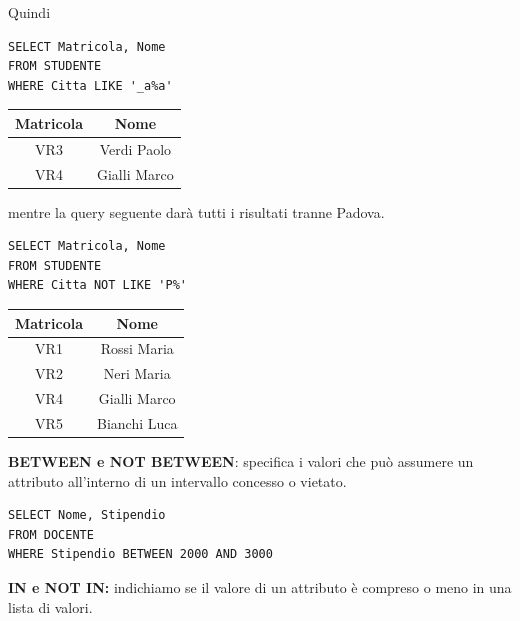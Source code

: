 \documentclass{article}
\begin{document}
Quindi 

\begin{minipage}{0.45\textwidth}
\begin{lstlisting}[style=sqlstyle]
SELECT Matricola, Nome
FROM STUDENTE
WHERE Citta LIKE '_a%a'
\end{lstlisting}
\end{minipage}
\hfill
\begin{minipage}{0.45\textwidth}

	\begin{tabular}{|c|c|}
		\hline
		\textbf{Matricola} & \textbf{Nome} \\
		\hline
		VR3 & Verdi Paolo \\
		\hline
		VR4 & Gialli Marco \\
		\hline
	\end{tabular}
\end{minipage}

mentre la query seguente darà tutti i risultati tranne Padova.

\begin{minipage}{0.45\textwidth}
\begin{lstlisting}[style=sqlstyle]
SELECT Matricola, Nome
FROM STUDENTE
WHERE Citta NOT LIKE 'P%'
\end{lstlisting}
\end{minipage}
\hfill
\begin{minipage}{0.45\textwidth}
	\begin{tabular}{|c|c|}
		\hline
		\textbf{Matricola} & \textbf{Nome} \\
		\hline
		VR1 & Rossi Maria \\
		\hline
		VR2 & Neri Maria \\
		\hline
		VR4 & Gialli Marco \\
		\hline
		VR5 & Bianchi Luca \\
		\hline
	\end{tabular}
\end{minipage}

\vspace{1em}
\textbf{BETWEEN e NOT BETWEEN}: specifica i valori che può assumere un attributo all'interno di un intervallo concesso o vietato.
\begin{lstlisting}[style=sqlstyle]
SELECT Nome, Stipendio
FROM DOCENTE
WHERE Stipendio BETWEEN 2000 AND 3000
\end{lstlisting}

\textbf{IN e NOT IN:} indichiamo se il valore di un attributo è compreso o meno in una lista di valori. 
\end{document}
